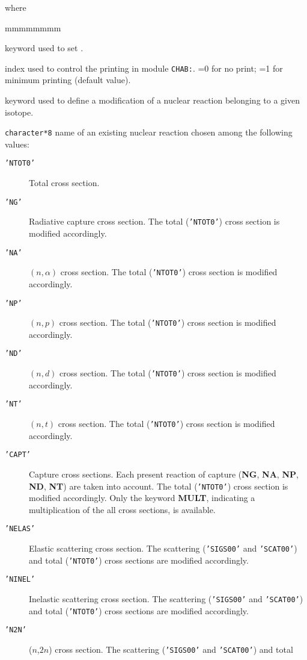 \noindent where
\begin{ListeDeDescription}{mmmmmmmm}

\item[\moc{EDIT}] keyword used to set .

\item[\dusa{iprint}] index used to control the printing in module {\tt CHAB:}. =0 for no print; =1 for minimum printing (default value).

\item[\moc{MODI}] keyword used to define a modification of a nuclear reaction belonging to a given isotope.

\item[\dusa{TYPSEC}] {\tt character*8} name of an existing nuclear reaction chosen among the following values:
\begin{description}
\item[{\tt 'NTOT0'}] Total cross section.
\item[{\tt 'NG'}] Radiative capture cross section. The total ({\tt 'NTOT0'}) cross section is modified accordingly.
\item[{\tt 'NA'}] $(n,\alpha)$ cross section. The total ({\tt 'NTOT0'}) cross section is modified accordingly.
\item[{\tt 'NP'}] $(n,p)$ cross section. The total ({\tt 'NTOT0'}) cross section is modified accordingly.
\item[{\tt 'ND'}] $(n,d)$ cross section. The total ({\tt 'NTOT0'}) cross section is modified accordingly.
\item[{\tt 'NT'}] $(n,t)$ cross section. The total ({\tt 'NTOT0'}) cross section is modified accordingly.
\item[{\tt 'CAPT'}] Capture cross sections. Each present reaction of capture (\textbf{NG}, \textbf{NA}, \textbf{NP}, \textbf{ND}, \textbf{NT}) are taken into account. The total ({\tt 'NTOT0'}) cross section is modified accordingly. Only the keyword \textbf{MULT}, indicating a multiplication of the all cross sections, is available.
\item[{\tt 'NELAS'}] Elastic scattering cross section. The scattering ({\tt 'SIGS00'} and {\tt 'SCAT00'}) and total
({\tt 'NTOT0'}) cross sections are modified accordingly.
\item[{\tt 'NINEL'}] Inelastic scattering cross section. The scattering ({\tt 'SIGS00'} and {\tt 'SCAT00'}) and total
({\tt 'NTOT0'}) cross sections are modified accordingly.
\item[{\tt 'N2N'}] ($n$,$2n$) cross section. The scattering ({\tt 'SIGS00'} and {\tt 'SCAT00'}) and total

\end{description}
\end{ListeDeDescription}
